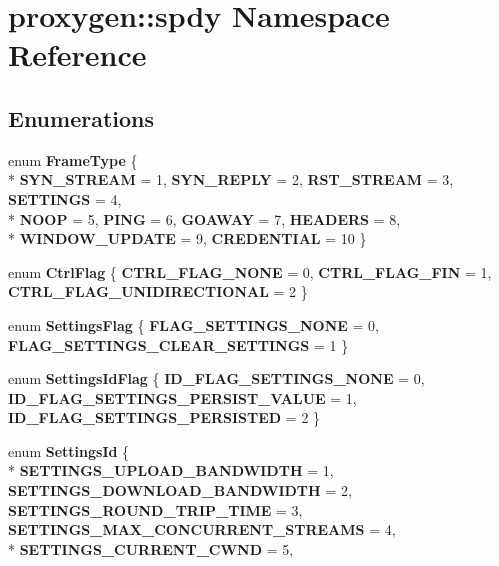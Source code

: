 \section{proxygen\+:\+:spdy Namespace Reference}
\label{namespaceproxygen_1_1spdy}
\subsection*{Enumerations}
\begin{DoxyCompactItemize}
\item 
enum {\bf Frame\+Type} \{ \\*
{\bf S\+Y\+N\+\_\+\+S\+T\+R\+E\+AM} = 1, 
{\bf S\+Y\+N\+\_\+\+R\+E\+P\+LY} = 2, 
{\bf R\+S\+T\+\_\+\+S\+T\+R\+E\+AM} = 3, 
{\bf S\+E\+T\+T\+I\+N\+GS} = 4, 
\\*
{\bf N\+O\+OP} = 5, 
{\bf P\+I\+NG} = 6, 
{\bf G\+O\+A\+W\+AY} = 7, 
{\bf H\+E\+A\+D\+E\+RS} = 8, 
\\*
{\bf W\+I\+N\+D\+O\+W\+\_\+\+U\+P\+D\+A\+TE} = 9, 
{\bf C\+R\+E\+D\+E\+N\+T\+I\+AL} = 10
 \}
\item 
enum {\bf Ctrl\+Flag} \{ {\bf C\+T\+R\+L\+\_\+\+F\+L\+A\+G\+\_\+\+N\+O\+NE} = 0, 
{\bf C\+T\+R\+L\+\_\+\+F\+L\+A\+G\+\_\+\+F\+IN} = 1, 
{\bf C\+T\+R\+L\+\_\+\+F\+L\+A\+G\+\_\+\+U\+N\+I\+D\+I\+R\+E\+C\+T\+I\+O\+N\+AL} = 2
 \}
\item 
enum {\bf Settings\+Flag} \{ {\bf F\+L\+A\+G\+\_\+\+S\+E\+T\+T\+I\+N\+G\+S\+\_\+\+N\+O\+NE} = 0, 
{\bf F\+L\+A\+G\+\_\+\+S\+E\+T\+T\+I\+N\+G\+S\+\_\+\+C\+L\+E\+A\+R\+\_\+\+S\+E\+T\+T\+I\+N\+GS} = 1
 \}
\item 
enum {\bf Settings\+Id\+Flag} \{ {\bf I\+D\+\_\+\+F\+L\+A\+G\+\_\+\+S\+E\+T\+T\+I\+N\+G\+S\+\_\+\+N\+O\+NE} = 0, 
{\bf I\+D\+\_\+\+F\+L\+A\+G\+\_\+\+S\+E\+T\+T\+I\+N\+G\+S\+\_\+\+P\+E\+R\+S\+I\+S\+T\+\_\+\+V\+A\+L\+UE} = 1, 
{\bf I\+D\+\_\+\+F\+L\+A\+G\+\_\+\+S\+E\+T\+T\+I\+N\+G\+S\+\_\+\+P\+E\+R\+S\+I\+S\+T\+ED} = 2
 \}
\item 
enum {\bf Settings\+Id} \{ \\*
{\bf S\+E\+T\+T\+I\+N\+G\+S\+\_\+\+U\+P\+L\+O\+A\+D\+\_\+\+B\+A\+N\+D\+W\+I\+D\+TH} = 1, 
{\bf S\+E\+T\+T\+I\+N\+G\+S\+\_\+\+D\+O\+W\+N\+L\+O\+A\+D\+\_\+\+B\+A\+N\+D\+W\+I\+D\+TH} = 2, 
{\bf S\+E\+T\+T\+I\+N\+G\+S\+\_\+\+R\+O\+U\+N\+D\+\_\+\+T\+R\+I\+P\+\_\+\+T\+I\+ME} = 3, 
{\bf S\+E\+T\+T\+I\+N\+G\+S\+\_\+\+M\+A\+X\+\_\+\+C\+O\+N\+C\+U\+R\+R\+E\+N\+T\+\_\+\+S\+T\+R\+E\+A\+MS} = 4, 
\\*
{\bf S\+E\+T\+T\+I\+N\+G\+S\+\_\+\+C\+U\+R\+R\+E\+N\+T\+\_\+\+C\+W\+ND} = 5, 

\end{DoxyCompactItemize}

